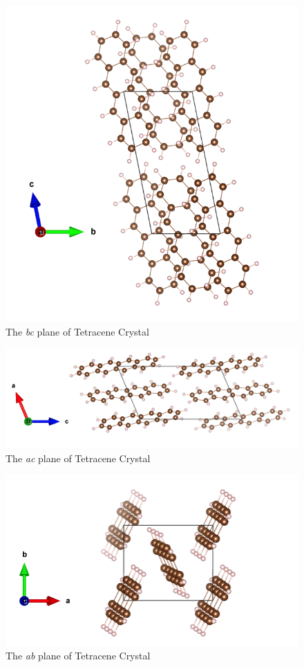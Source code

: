 \documentclass[12pt,a4paper,openany]{book}
\begin{document}
 	\begin{figure}[h]
 		\centering
 		\includegraphics[scale=0.6]{T-a}
 		\caption{The \textit{bc} plane of Tetracene Crystal}  
 	\end{figure}
 	
 	\begin{figure}[h]
 		\centering
 		\includegraphics[scale=0.6]{T-b}
 		\caption{The \textit{ac} plane of Tetracene Crystal} 
 	\end{figure}
 	
 	\begin{figure}[h]
 		\centering
 		\includegraphics[scale=0.6]{T-c}
 		\caption{The \textit{ab} plane of Tetracene Crystal}  
 	\end{figure}
	
\end{document}
